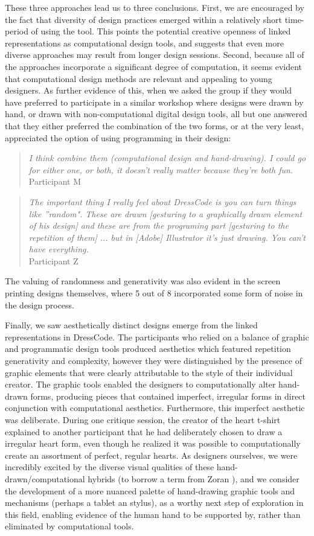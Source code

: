 \documentclass{sigchi}
\begin{document}
These three approaches lead us to three conclusions. First, we are encouraged by the fact that diversity of design practices emerged within a relatively short time-period of using the tool. This points the potential creative openness of linked representations as computational design tools, and suggests that even more diverse approaches may result from longer design sessions. Second, because all of the approaches incorporate a significant degree of computation, it seems evident that computational design methods are relevant and appealing to young designers. As further evidence of this, when we asked the group if they would have preferred to participate in a similar workshop where designs were drawn by hand, or drawn with non-computational digital design tools, all but one answered that they either preferred the combination of the two forms, or at the very least, appreciated the option of using programming in their design:
\begin{quotation}
\textit{I think combine them (computational design and hand-drawing). I could go for either one, or both, it doesn't really matter because they're both fun.}
\\Participant M
\end{quotation}
\begin{quotation}
\textit{The important thing I really feel about DressCode is you can turn things like ''random". These are drawn [gesturing to a graphically drawn element of his design] and these are from the programing part [gesturing to the repetition of them] ... but in [Adobe] Illustrator it's just drawing. You can't have everything.}
\\Participant Z
\end{quotation}
The valuing of randomness and generativity was also evident in the screen printing designs themselves, where 5 out of 8 incorporated some form of noise in the design process. 

Finally, we saw aesthetically distinct designs emerge from the linked representations in DressCode. The participants who relied on a balance of graphic and programmatic design tools produced aesthetics which featured repetition generativity and complexity, however they were distinguished by the presence of graphic elements that were clearly attributable to the style of their individual creator. The graphic tools enabled the designers to computationally alter hand-drawn forms, producing pieces that contained imperfect, irregular forms in direct conjunction with computational aesthetics. Furthermore, this imperfect aesthetic was deliberate. During one critique session, the creator of the heart t-shirt explained to another participant that he had deliberately chosen to draw a irregular heart form, even though he realized it was possible to computationally create an assortment of perfect, regular hearts. As designers ourselves, we were incredibly excited by the diverse visual qualities of these hand-drawn/computational hybrids (to borrow a term from Zoran \cite{zoran_tochi}), and we consider the development of a more nuanced palette of hand-drawing graphic tools and mechanisms (perhaps a tablet an stylus), as a worthy next step of exploration in this field, enabling evidence of the human hand to be supported by, rather than eliminated by computational tools.
\end{document}
